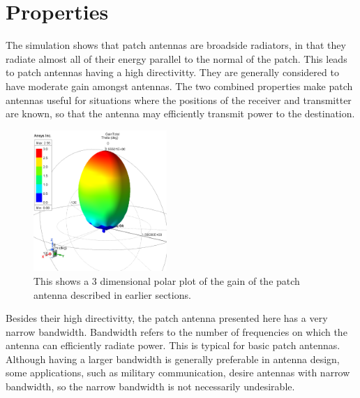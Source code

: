 \documentclass[12pt]{article}
\begin{document}
\section{Properties}

The simulation shows that patch antennas are broadside radiators, in that they radiate almost all of their energy parallel to the normal of the patch. This leads to patch antennas having a high directivitty. They are generally considered to have moderate gain amongst antennas\cite{khan2015microstrip}. The two combined properties make patch antennas useful for situations where the positions of the receiver and transmitter are known, so that the antenna may efficiently transmit power to the destination. 
\newpage
\begin{figure}[h]
    \centering
    \includegraphics[width=0.45\textwidth]{basic-patch-antenna-gain.png}
    \caption{This shows a 3 dimensional polar plot of the gain of the patch antenna described in earlier sections.}
\end{figure}

Besides their high directivitty, the patch antenna presented here has a very narrow bandwidth. Bandwidth refers to the number of frequencies on which the antenna can efficiently radiate power. This is typical for basic patch antennas\cite{balanis2016antenna}. Although having a larger bandwidth is generally preferable in antenna design, some applications, such as military communication, desire antennas with narrow bandwidth\cite{balanis2016antenna}, so the narrow bandwidth is not necessarily undesirable.
\end{document}
